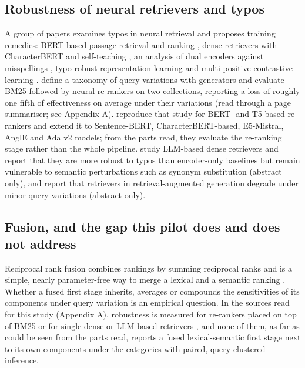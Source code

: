 \documentclass[
  11pt,
]{article}
\begin{document}
\hypertarget{robustness-of-neural-retrievers-and-typos}{%
\subsection{Robustness of neural retrievers and
typos}\label{robustness-of-neural-retrievers-and-typos}}

A group of papers examines typos in neural retrieval and proposes
training remedies: BERT-based passage retrieval and ranking
\citep{zhuang2021}, dense retrievers with CharacterBERT and
self-teaching \citep{zhuang2022}, an analysis of dual encoders against
misspellings \citep{sidiropoulos2022}, typo-robust representation
learning \citep{tasawong2023} and multi-positive contrastive learning
\citep{sidiropoulos2024}. \citet{penha2022} define a taxonomy of query
variations with generators and evaluate BM25 followed by neural
re-rankers on two collections, reporting a loss of roughly one fifth of
effectiveness on average under their variations (read through a page
summariser; see Appendix A). \citet{hagen2024} reproduce that study for
BERT- and T5-based re-rankers and extend it to Sentence-BERT,
CharacterBERT-based, E5-Mistral, AnglE and Ada v2 models; from the parts
read, they evaluate the re-ranking stage rather than the whole pipeline.
\citet{li2026} study LLM-based dense retrievers and report that they are
more robust to typos than encoder-only baselines but remain vulnerable
to semantic perturbations such as synonym substitution (abstract only),
and \citet{percin2025} report that retrievers in retrieval-augmented
generation degrade under minor query variations (abstract only).

\hypertarget{fusion-and-the-gap-this-pilot-does-and-does-not-address}{%
\subsection{Fusion, and the gap this pilot does and does not
address}\label{fusion-and-the-gap-this-pilot-does-and-does-not-address}}

Reciprocal rank fusion combines rankings by summing reciprocal ranks and
is a simple, nearly parameter-free way to merge a lexical and a semantic
ranking \citep{cormack2009}. Whether a fused first stage inherits,
averages or compounds the sensitivities of its components under query
variation is an empirical question. In the sources read for this study
(Appendix A), robustness is measured for re-rankers placed on top of
BM25 \citep{penha2022, hagen2024} or for single dense or LLM-based
retrievers \citep{li2026, percin2025}, and none of them, as far as could
be seen from the parts read, reports a fused lexical-semantic first
stage next to its own components under the \citet{penha2022} categories
with paired, query-clustered inference.
\end{document}
